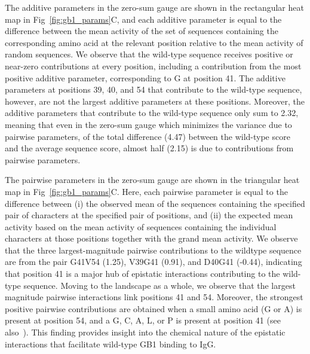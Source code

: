 \documentclass[10pt,letterpaper]{article}
\newcommand{\fig}[2]{Fig\ \ref{#1}#2}
\begin{document}
The additive parameters in the zero-sum gauge are shown in the rectangular heat map in \fig{fig:gb1_params}C, and each additive parameter is equal to the difference between the mean activity of the set of sequences containing the corresponding amino acid at the relevant position relative to the mean activity of random sequences. We observe that the wild-type sequence receives positive or near-zero contributions at every position, including a contribution from the most positive additive parameter, corresponding to G at position 41. The additive parameters at positions 39, 40, and 54 that contribute to the wild-type sequence, however, are not the largest additive parameters at these positions. Moreover, the additive parameters that contribute to the wild-type sequence only sum to 2.32, meaning that even in the zero-sum gauge which minimizes the variance due to pairwise parameters, of the total difference (4.47) between the wild-type score and the average sequence score, almost half (2.15) is due to contributions from pairwise parameters.

The pairwise parameters in the zero-sum gauge are shown in the triangular heat map in \fig{fig:gb1_params}C. Here, each pairwise parameter is equal to the difference between (i) the observed mean of the sequences containing the specified pair of characters at the specified pair of positions, and (ii) the expected mean activity based on the mean activity of sequences containing the individual characters at those positions together with the grand mean activity. We observe that the three largest-magnitude pairwise contributions to the wildtype sequence are from the pair G41V54 (1.25), V39G41 (0.91), and D40G41 (-0.44), indicating that position 41 is a major hub of epistatic interactions contributing to the wild-type sequence. Moving to the landscape as a whole, we observe that the largest magnitude pairwise interactions link positions 41 and 54. Moreover, the strongest positive pairwise contributions are obtained when a small amino acid (G or A) is present at position 54, and a G, C, A, L, or P is present at position 41 (see also~\cite{Olson:2014iq}). This finding provides insight into the chemical nature of the epistatic interactions that facilitate wild-type GB1 binding to IgG. 
\end{document}
